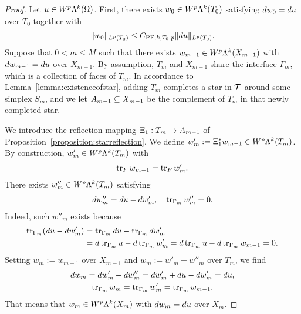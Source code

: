 \documentclass[10pt,a4paper]{article}
\begin{document}
\begin{proof}
    Let $u \in W^{p}\Lambda^{k}(\Omega)$. 
    First, there exists $w_0 \in W^{p}\Lambda^{k}(T_{0})$ satisfying $d w_0 = d u$ over $T_{0}$ together with 
    \begin{gather*}
        \| w_0 \|_{L^{p}(T_{0})} \leq C_{{{\rm PF}},k,T_{0},p} \| d u \|_{L^{p}(T_{0})}.
    \end{gather*}
    Suppose that $0 < m \leq M$ such that there exists $w_{m-1} \in W^{p}\Lambda^{k}(X_{m-1})$ 
    with $d w_{m-1} = d u$ over $X_{m-1}$. 
    By assumption, $T_{m}$ and $X_{m-1}$ share the interface $\Gamma_{m}$, which is a collection of faces of $T_{m}$. 
    In accordance to Lemma~\ref{lemma:existenceofstar}, adding $T_{m}$ completes a star in ${\mathcal T}$ around some simplex $S_{m}$, 
	and we let $A_{m-1} \subseteq X_{m-1}$ be the complement of $T_{m}$ in that newly completed star. 
    
    We introduce the reflection mapping $\Xi_{1} : T_{m} \rightarrow A_{m-1}$ of Proposition~\ref{proposition:starreflection}. 
    We define $w'_{m} :=  \Xi_{1}^{\ast} w_{m-1} \in W^{p}\Lambda^{k}(T_{m})$. 
    By construction, $w'_{m} \in W^{p}\Lambda^{k}(T_{m})$ with 
    \begin{align*}
        \operatorname{tr}_F w_{m-1} = \operatorname{tr}_F w'_{m}
        . 
    \end{align*}
    There exists $w''_{m} \in W^{p}\Lambda^{k}(T_{m})$ satisfying 
    \begin{align*}
        d w''_{m} = d u - d w'_{m}, 
        \quad 
        \operatorname{tr}_{\Gamma_{m}} w''_{m} = 0.
    \end{align*}
    Indeed, such $w''_{m}$ exists because 
    \begin{align*}
        \operatorname{tr}_{\Gamma_{m}}( d u - d w'_{m} ) 
        &= 
        \operatorname{tr}_{\Gamma_{m}} d u - \operatorname{tr}_{\Gamma_{m}} d w'_{m}
        \\&= 
        d \operatorname{tr}_{\Gamma_{m}} u - d \operatorname{tr}_{\Gamma_{m}} w'_{m}
        = 
        d \operatorname{tr}_{\Gamma_{m}} u - d \operatorname{tr}_{\Gamma_{m}} w_{m-1}
        = 
        0
        .
    \end{align*}
    Setting $w_{m} := w_{m-1}$ over $X_{m-1}$ and $w_{m} := w'_{m} + w''_{m}$ over $T_{m}$, 
    we find 
    \begin{gather*}
        d w_{m} = d w'_{m} + d w''_{m} = d w'_{m} + d u - d w'_{m} = d u,
        \\
        \operatorname{tr}_{\Gamma_{m}} w_{m} = \operatorname{tr}_{\Gamma_{m}} w'_{m} = \operatorname{tr}_{\Gamma_{m}} w_{m-1}.
    \end{gather*}
    That means that $w_{m} \in W^{p}\Lambda^{k}(X_{m})$ with $d w_{m} = d u$ over $X_{m}$. 
    

\end{proof}
\end{document}

